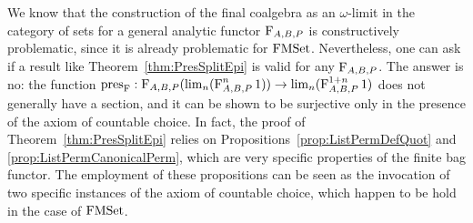 \documentclass[a4paper,USenglish,cleveref]{lipics-v2021}
\begin{document}
We know that the construction of the final coalgebra as an $\omega$-limit in the category of sets for a general analytic functor $\Op{F}_{A,B,P}$ is constructively problematic, since it is already problematic for $\FMSet$. Nevertheless, one can ask if a result like Theorem~\ref{thm:PresSplitEpi} is valid for any $\Op{F}_{A,B,P}$. The answer is no: the function $\pres{\Op{F}} : \Op{F}_{A,B,P} (\lim_{n} (\Op{F}_{A,B,P}^n 1)) \to \lim_{n} (\Op{F}_{A,B,P}^{1 + n} 1)$ does not generally have a section, and it can be shown to be surjective only in the presence of the axiom of countable choice. In fact, the proof of Theorem~\ref{thm:PresSplitEpi} relies on Propositions~\ref{prop:ListPermDefQuot} and \ref{prop:ListPermCanonicalPerm}, which are very specific properties of the finite bag functor. 
The employment of these propositions can be seen as the invocation of two specific instances of the axiom of countable choice, which happen to be hold in the case of $\FMSet$.
\end{document}
